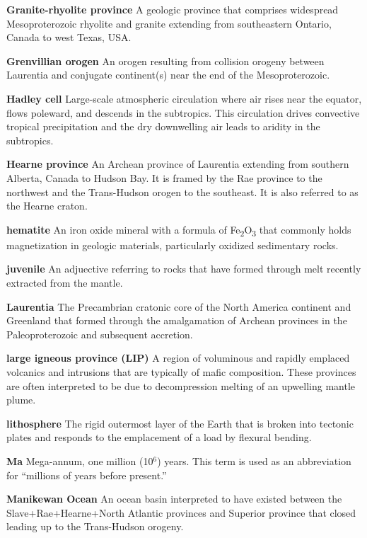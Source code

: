 \documentclass[twocolumn, switch]{article} %
\begin{document}
\noindent\textbf{Granite-rhyolite province } A geologic province that comprises widespread Mesoproterozoic rhyolite and granite extending from southeastern Ontario, Canada to west Texas, USA.

\noindent\textbf{Grenvillian orogen } An orogen resulting from collision orogeny between Laurentia and conjugate continent(s) near the end of the Mesoproterozoic.

\noindent\textbf{Hadley cell } Large-scale atmospheric circulation where air rises near the equator, flows poleward, and descends in the subtropics. This circulation drives convective tropical precipitation and the dry downwelling air leads to aridity in the subtropics.

\noindent\textbf{Hearne province } An Archean province of Laurentia extending from southern Alberta, Canada to Hudson Bay. It is framed by the Rae province to the northwest and the Trans-Hudson orogen to the southeast. It is also referred to as the Hearne craton.

\noindent\textbf{hematite } An iron oxide mineral with a formula of Fe\textsubscript{2}O\textsubscript{3} that commonly holds magnetization in geologic materials, particularly oxidized sedimentary rocks.

\noindent\textbf{juvenile } An adjuective referring to rocks that have formed through melt recently extracted from the mantle.

\noindent\textbf{Laurentia } The Precambrian cratonic core of the North America continent and Greenland that formed through the amalgamation of Archean provinces in the Paleoproterozoic and subsequent accretion.

\noindent\textbf{large igneous province (LIP) } A region of voluminous and rapidly emplaced volcanics and intrusions that are typically of mafic composition. These provinces are often interpreted to be due to decompression melting of an upwelling mantle plume.

\noindent\textbf{lithosphere } The rigid outermost layer of the Earth that is broken into tectonic plates and responds to the emplacement of a load by flexural bending.

\noindent\textbf{Ma } Mega-annum, one million (10$^6$) years. This term is used as an abbreviation for ``millions of years before present.''

\noindent\textbf{Manikewan Ocean } An ocean basin interpreted to have existed between the  Slave+Rae+Hearne+North Atlantic provinces and Superior province that closed leading up to the Trans-Hudson orogeny.
\end{document}
